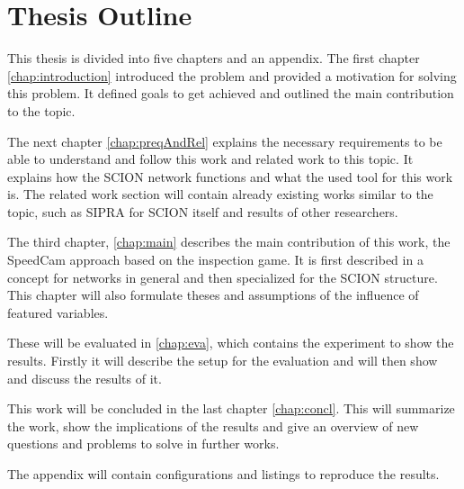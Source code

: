 \documentclass[thesis.tex]{subfiles}
\begin{document}
\section{Thesis Outline}
This thesis is divided into five chapters and an appendix. The first chapter \autoref{chap:introduction} introduced the problem and provided a motivation for solving this problem. It defined goals to get achieved and outlined the main contribution to the topic.

The next chapter \autoref{chap:preqAndRel} explains the necessary requirements to be able to understand and follow this work and related work to this topic. It explains how the SCION network functions and what the used tool for this work is. The related work section will contain already existing works similar to the topic, such as SIPRA for SCION itself and results of other researchers. 

The third chapter, \autoref{chap:main} describes the main contribution of this work, the SpeedCam approach based on the inspection game. It is first described in a concept for networks in general and then specialized for the SCION structure. This chapter will also formulate theses and assumptions of the influence of featured variables.

These will be evaluated in \autoref{chap:eva}, which contains the experiment to show the results. Firstly it will describe the setup for the evaluation and will then show and discuss the results of it.

This work will be concluded in the last chapter \autoref{chap:concl}. This will summarize the work, show the implications of the results and give an overview of new questions and problems to solve in further works.

The appendix will contain configurations and listings to reproduce the results.

\subfilebib %
\end{document}
